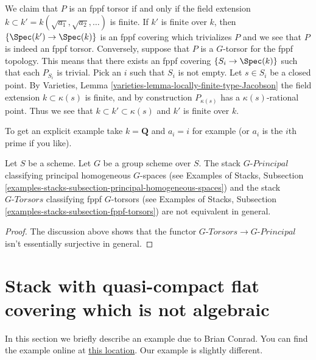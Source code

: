 \medskip\noindent
We claim that $P$ is an fppf torsor if and only if the field extension
$k \subset k' = k(\sqrt{a_1}, \sqrt{a_2}, \ldots)$ is finite.
If $k'$ is finite over $k$, then
$\{\Spec(k') \to \Spec(k)\}$
is an fppf covering which trivializes $P$ and we see that $P$ is indeed
an fppf torsor. Conversely, suppose that $P$ is a $G$-torsor for the
fppf topology. This means that there exists an fppf covering
$\{S_i \to \Spec(k)\}$ such that each $P_{S_i}$ is trivial.
Pick an $i$ such that $S_i$ is not empty. Let $s \in S_i$ be a closed
point. By
Varieties, Lemma \ref{varieties-lemma-locally-finite-type-Jacobson}
the field extension $k \subset \kappa(s)$ is finite, and by construction
$P_{\kappa(s)}$ has a $\kappa(s)$-rational point. Thus we see that
$k \subset k' \subset \kappa(s)$ and $k'$ is finite over $k$.

\medskip\noindent
To get an explicit example take $k = \mathbf{Q}$ and $a_i = i$
for example (or $a_i$ is the $i$th prime if you like).

\begin{lemma}
\label{lemma-torsors-principal-spaces-not-equal}
Let $S$ be a scheme. Let $G$ be a group scheme over $S$.
The stack $G\textit{-Principal}$ classifying principal homogeneous $G$-spaces
(see Examples of Stacks, Subsection
\ref{examples-stacks-subsection-principal-homogeneous-spaces})
and the stack $G\textit{-Torsors}$ classifying fppf $G$-torsors
(see Examples of Stacks, Subsection
\ref{examples-stacks-subsection-fppf-torsors})
are not equivalent in general.
\end{lemma}

\begin{proof}
The discussion above shows that the functor
$G\textit{-Torsors} \to G\textit{-Principal}$ isn't essentially
surjective in general.
\end{proof}









\section{Stack with quasi-compact flat covering which is not algebraic}
\label{section-not-algebraic-stack}

\noindent
In this section we briefly describe an example due to Brian Conrad.
You can find the example online at
\href{http://mathoverflow.net/questions/15082/fpqc-covers-of-stacks/15269#15269}{this location}.
Our example is slightly different.

